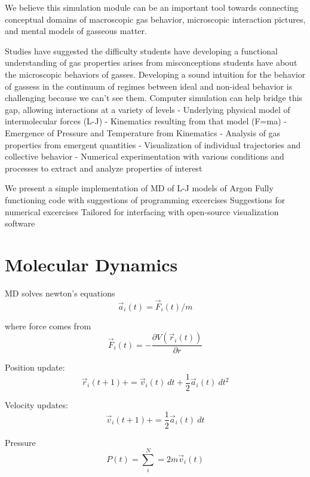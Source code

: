 \documentclass[journal=jpclcd,manuscript=article]{achemso}
\begin{document}
We believe this simulation module can be an important tool towards connecting conceptual domains of macroscopic gas behavior,
microscopic interaction pictures, and mental models of gasseous matter. 

Studies have suggested the difficulty students have developing a functional understanding of gas properties 
arises from misconceptions students have about the microscopic behaviors of gasses.  
Developing a sound intuition for the behavior of gassess in the continuum of regimes between ideal and non-ideal
behavior is challenging because we can't see them.  
Computer simulation can help bridge this gap, allowing interactions at a variety of levels
- Underlying physical model of intermolecular forces (L-J)
- Kinematics resulting from that model (F=ma)
- Emergence of Pressure and Temperature from Kinematics
- Analysis of gas properties from emergent quantities
- Visualization of individual trajectories and collective behavior
- Numerical experimentation with various conditions and processes to extract and analyze properties of interest


We present a simple implementation of MD of L-J models of Argon
Fully functioning code with suggestions of programming excercises
Suggestions for numerical excercises
Tailored for interfacing with open-source visualization software
 
\section{Molecular Dynamics}
MD solves newton's equations
\begin{equation}
\vec{a}_i(t) = \vec{F}_i(t) / m
\end{equation}

where force comes from
\begin{equation}
\vec{F}_i(t) = -\frac{ \partial V( \vec{r}_i(t) ) }{ \partial r}
\end{equation}

Position update:
\begin{equation}
\vec{r}_{i}(t+1) += \vec{v}_i(t) \: dt + \frac{1}{2} \vec{a}_i(t) \: dt^2 
\end{equation}

Velocity updates:
\begin{equation}
\vec{v}_i (t+1) += \frac{1}{2} \vec{a}_i(t) \: dt
\end{equation}

Pressure
\begin{equation}
P(t) = \sum_i^N = 2 m \vec{v}_i(t)
\end{equation}
\end{document}
